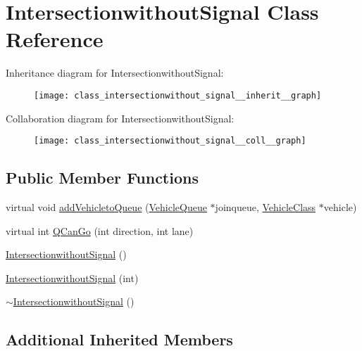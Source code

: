 \hypertarget{class_intersectionwithout_signal}{\section{Intersectionwithout\-Signal Class Reference}
\label{class_intersectionwithout_signal}
}


Inheritance diagram for Intersectionwithout\-Signal\-:\nopagebreak
\begin{figure}[H]
\begin{center}
\leavevmode
\texttt{[image: class\_intersectionwithout\_signal\_\_inherit\_\_graph]}
\end{center}
\end{figure}


Collaboration diagram for Intersectionwithout\-Signal\-:\nopagebreak
\begin{figure}[H]
\begin{center}
\leavevmode
\texttt{[image: class\_intersectionwithout\_signal\_\_coll\_\_graph]}
\end{center}
\end{figure}
\subsection*{Public Member Functions}
\begin{DoxyCompactItemize}
\item 
virtual void \hyperlink{class_intersectionwithout_signal_ab538d75fb2afe614867754e0debbd2e2}{add\-Vehicleto\-Queue} (\hyperlink{class_vehicle_queue}{Vehicle\-Queue} $\ast$joinqueue, \hyperlink{class_vehicle_class}{Vehicle\-Class} $\ast$vehicle)
\item 
virtual int \hyperlink{class_intersectionwithout_signal_ac003b0651a33eb53986c4b0389f2c788}{Q\-Can\-Go} (int direction, int lane)
\item 
\hyperlink{class_intersectionwithout_signal_a7c81c93bba932977e99b65eeb46eed9c}{Intersectionwithout\-Signal} ()
\item 
\hyperlink{class_intersectionwithout_signal_a7afe1b9d80f5424b5cb36448245b3453}{Intersectionwithout\-Signal} (int)
\item 
\hyperlink{class_intersectionwithout_signal_aefe421c50207cf3528e6a6338b90c7b6}{$\sim$\-Intersectionwithout\-Signal} ()
\end{DoxyCompactItemize}
\subsection*{Additional Inherited Members}



